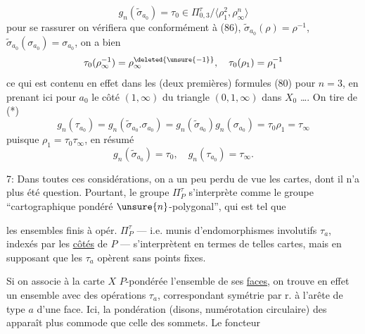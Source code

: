 \[
\tag{*} g_n(\widetilde\sigma_{a_0})=\tau_0\in
\Pi_{0,3}^{\tau}/\langle\rho_1^2,\rho_\infty^n\rangle
\]
pour se rassurer on vérifiera que conformément à (86), $\widetilde\sigma_{a_0}(\rho)=\rho^{-1}$, $\widetilde\sigma_{a_0}(\sigma_{a_0})=\sigma_{a_0}$, on a bien
\[
\tau_0(\rho_\infty^{-1})=\rho_\infty^{\deleted{\unsure{-1}}},\quad
\tau_0(\rho_1)=\rho_1^{-1}
\]
ce qui est contenu en effet dans les (deux premières) formules (80) pour $n=3$, en prenant ici pour $a_0$ le côté $(1,\infty)$ du triangle $(0,1,\infty)$  dans $X_0$ \ldots. On tire de  (*)
\[
g_n(\tau_{a_0})=g_n(\widetilde\sigma_{a_0}.\sigma_{a_0})
=g_n(\widetilde\sigma_{a_0})g_n(\sigma_{a_0})
=\tau_0\rho_1=\tau_\infty
\]
puisque $\rho_1=\tau_0\tau_\infty$,  en résumé
\[
\tag{100}
g_n(\widetilde\sigma_{a_0})=\tau_0,\quad g_n(\tau_{a_0})=\tau_\infty.
\]


7: Dans toutes ces considérations,  on a un peu perdu de vue les cartes, dont il n'a plus été question. Pourtant, le groupe $\Pi_P^\tau$ s'interprète comme le groupe ``cartographique pondéré $\unsure{n}$-polygonal'', qui est tel que

les  ensembles finis à opér. $\Pi_P^\tau$ — i.e. munis d'endomorphismes  involutifs $\tau_a$, indexés par les \uline{côtés} de $P$ — s'interprètent en termes de telles cartes, mais en supposant que les $\tau_a$ opèrent sans points fixes. 


Si on associe à la carte $X$ $P$-pondérée l'ensemble  de ses \uline{faces}, on trouve en effet un ensemble avec des opérations $\tau_a$,  correspondant   symétrie par r.  à l'arête de type $a$ d'une face. Ici, la pondération (disons, numérotation circulaire) des   apparaît plus commode que celle des sommets. Le foncteur


